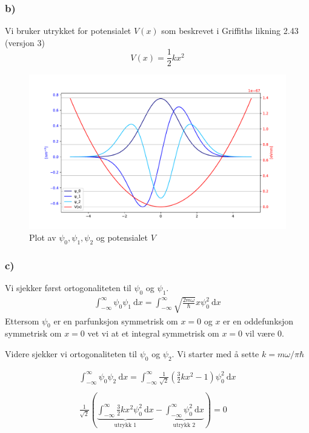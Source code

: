 \documentclass{article}
\begin{document}
\subsubsection*{b)}
Vi bruker utrykket for potensialet $V(x)$ som beskrevet i Griffiths likning 2.43 (versjon 3)
\begin{equation}\label{eq: V(x)}
V(x) = \frac{1}{2}kx^2
\end{equation}
\begin{figure}[h!]
  \centering
  \includegraphics[width = \textwidth]{4b.pdf}
  \caption{Plot av $ψ_0, ψ_1, ψ_2$ og potensialet $V$}
  \label{fig: 4.b}
\end{figure}


\subsubsection*{c)}
Vi sjekker først ortogonaliteten til $ψ_0$ og $ψ_1$. 
\begin{align*}
∫_{-∞}^{∞} ψ_0 ψ_1 \ \mathrm{d}x = ∫_{-∞}^{∞} \sqrt{\frac{2mω}{ℏ}}x ψ_0^2 \ \mathrm{d}x
\end{align*}
Ettersom $ψ_0$ er en parfunksjon symmetrisk om $x=0$ og $x$ er en oddefunksjon symmetrisk om $x=0$ vet vi at et integral symmetrisk om $x=0$ vil være 0. \newline

Videre sjekker vi ortogonaliteten til $ψ_0$ og $ψ_2$. Vi starter med å sette $k = mω / πℏ$

\begin{align*}
  ∫_{-∞}^{∞} ψ_0ψ_2 \ \mathrm{d}x = ∫_{-∞}^{∞} \frac{1}{\sqrt{2}}\left(\frac{3}{2}kx^2 - 1\right)ψ_0^2 \ \mathrm{d}x \\
  \\
  \frac{1}{\sqrt{2}}\left(\underbrace{∫_{-∞}^{∞} \frac{3}{2}kx^2 ψ_0^2 \ \mathrm{d}x }_{\text{utrykk 1}}- \underbrace{∫_{-∞}^{∞} ψ_0^2 \ \mathrm{d}x} _{\text{utrykk 2}} \right) = 0
\end{align*} 
\end{document}
